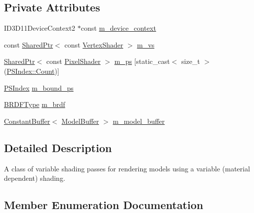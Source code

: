\subsection*{Private Attributes}
\begin{DoxyCompactItemize}
\item 
I\+D3\+D11\+Device\+Context2 $\ast$const \hyperlink{classmage_1_1_variable_shading_pass_afff786ea38b64ba069866fdd6b525ba7}{m\+\_\+device\+\_\+context}
\item 
const \hyperlink{namespacemage_a1e01ae66713838a7a67d30e44c67703e}{Shared\+Ptr}$<$ const \hyperlink{classmage_1_1_vertex_shader}{Vertex\+Shader} $>$ \hyperlink{classmage_1_1_variable_shading_pass_aa91a1e8628c2f671adadd919376aa67e}{m\+\_\+vs}
\item 
\hyperlink{namespacemage_a1e01ae66713838a7a67d30e44c67703e}{Shared\+Ptr}$<$ const \hyperlink{namespacemage_a27ecaf266420ee7a494d64edc0757129}{Pixel\+Shader} $>$ \hyperlink{classmage_1_1_variable_shading_pass_aacd5b6b967a0fcfe7510e289c3d630a0}{m\+\_\+ps} \mbox{[}static\+\_\+cast$<$ size\+\_\+t $>$(\hyperlink{classmage_1_1_variable_shading_pass_a49519e421ac5be93136d9efdbf075d4aae93f994f01c537c4e2f7d8528c3eb5e9}{P\+S\+Index\+::\+Count})\mbox{]}
\item 
\hyperlink{classmage_1_1_variable_shading_pass_a49519e421ac5be93136d9efdbf075d4a}{P\+S\+Index} \hyperlink{classmage_1_1_variable_shading_pass_acb1d0d78a9de9afc2d668d87134c5ec5}{m\+\_\+bound\+\_\+ps}
\item 
\hyperlink{namespacemage_ae7a7a03a7b34d7e2689689bb8295cd38}{B\+R\+D\+F\+Type} \hyperlink{classmage_1_1_variable_shading_pass_ac6147f2068fd7727fe2d78584ff68767}{m\+\_\+brdf}
\item 
\hyperlink{structmage_1_1_constant_buffer}{Constant\+Buffer}$<$ \hyperlink{structmage_1_1_model_buffer}{Model\+Buffer} $>$ \hyperlink{classmage_1_1_variable_shading_pass_ab83602f0ffa6c0a3519ffaa467ae113a}{m\+\_\+model\+\_\+buffer}
\end{DoxyCompactItemize}


\subsection{Detailed Description}
A class of variable shading passes for rendering models using a variable (material dependent) shading. 

\subsection{Member Enumeration Documentation}
\hypertarget{classmage_1_1_variable_shading_pass_a49519e421ac5be93136d9efdbf075d4a}{}\label{classmage_1_1_variable_shading_pass_a49519e421ac5be93136d9efdbf075d4a} 
